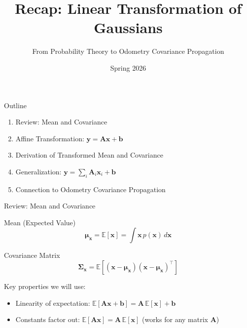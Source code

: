 \documentclass[aspectratio=169, 11pt]{beamer}
\title{Recap: Linear Transformation of Gaussians}
\subtitle{From Probability Theory to Odometry Covariance Propagation}
\institute{RT604 SLAM Course\\Department of Robotics \& Mechatronics Engineering\\DGIST}
\date{Spring 2026}
\newcommand{\E}{\mathbb{E}}
\newcommand{\T}{^{\top}}
\begin{document}
{
\begin{frame}
\titlepage
\end{frame}
}

\begin{frame}{Outline}
\begin{enumerate}
  \setlength{\itemsep}{12pt}
  \item Review: Mean and Covariance
  \item Affine Transformation: $\mathbf{y} = \mathbf{A}\mathbf{x} + \mathbf{b}$
  \item Derivation of Transformed Mean and Covariance
  \item Generalization: $\mathbf{y} = \sum_i \mathbf{A}_i \mathbf{x}_i + \mathbf{b}$
  \item Connection to Odometry Covariance Propagation
\end{enumerate}
\end{frame}

\begin{frame}{Review: Mean and Covariance}

\begin{block}{Mean (Expected Value)}
$$\bm{\mu}_{\mathbf{x}} = \E[\mathbf{x}] = \int \mathbf{x} \, p(\mathbf{x}) \, d\mathbf{x}$$
\end{block}

\vspace{4pt}

\begin{block}{Covariance Matrix}
$$\bm{\Sigma}_{\mathbf{x}} = \E\!\left[(\mathbf{x} - \bm{\mu}_{\mathbf{x}})(\mathbf{x} - \bm{\mu}_{\mathbf{x}})\T\right]$$
\end{block}

\vspace{6pt}

Key properties we will use:
\begin{itemize}
  \item Linearity of expectation: $\E[\mathbf{A}\mathbf{x} + \mathbf{b}] = \mathbf{A}\,\E[\mathbf{x}] + \mathbf{b}$
  \item Constants factor out: $\E[\mathbf{A}\mathbf{x}] = \mathbf{A}\,\E[\mathbf{x}]$ (works for any matrix $\mathbf{A}$)
\end{itemize}

\end{frame}
\end{document}
